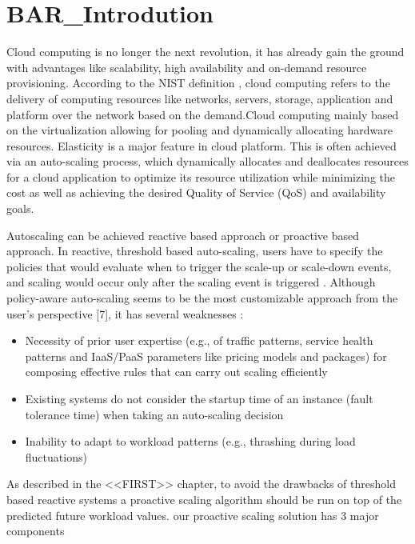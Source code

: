 \section{BAR_Introdution}

Cloud computing is no longer the next revolution, it has already gain the ground with advantages like scalability, high availability and on-demand resource provisioning. According to the NIST definition \cite{Mell_2011} , cloud computing refers to the delivery of computing resources like networks, servers, storage, application and platform over the network based on the demand.Cloud computing mainly based on the virtualization allowing for pooling and dynamically allocating hardware resources. Elasticity is a major feature in cloud platform. This is often achieved via an auto-scaling process, which dynamically allocates and deallocates resources for a cloud application to optimize its resource utilization while minimizing the cost as well as achieving the desired Quality of Service (QoS) and availability goals\cite{Roy_2011}\cite{Armbrust_2010}.

Autoscaling can be achieved  reactive based approach or proactive based approach. In reactive, threshold based auto-scaling, users have to specify the policies that would evaluate when to trigger the scale-up or scale-down events, and scaling would occur only after the scaling event is triggered \cite{Lorido_Botran_2014} .
Although policy-aware auto-scaling seems to be the most customizable approach from the user’s perspective [7], it has several weaknesses \cite{Alipour:2014:AAI:2735522.2735532} :

\begin{itemize}
\item Necessity of prior user expertise (e.g., of traffic patterns, service health patterns and IaaS/PaaS parameters like pricing models and packages) for composing effective rules that can carry out scaling efficiently
\item Existing systems do not consider the startup time of an instance (fault tolerance time) when taking an auto-scaling decision
\item Inability to adapt to workload patterns (e.g., thrashing during load fluctuations)
\end{itemize}


As described in the <<FIRST>> chapter, to avoid the drawbacks of threshold based reactive systems a proactive scaling algorithm should be run on top of the predicted future workload values. our proactive scaling solution has 3 major components

